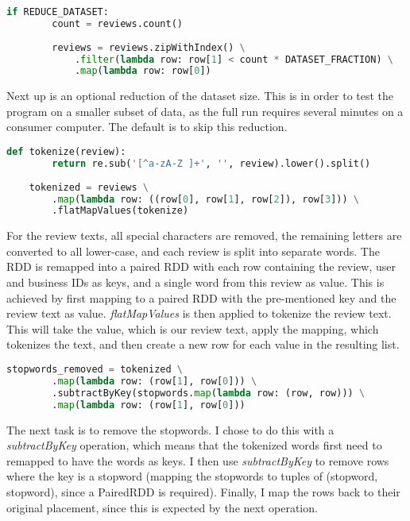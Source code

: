 \documentclass[a4paper]{article}
\begin{document}
\begin{lstlisting}[language=python]
    if REDUCE_DATASET:
        count = reviews.count()
        
        reviews = reviews.zipWithIndex() \
            .filter(lambda row: row[1] < count * DATASET_FRACTION) \
            .map(lambda row: row[0])
\end{lstlisting}

Next up is an optional reduction of the dataset size. This is in order to test the program on a smaller subset of data, as the full run requires several minutes on a consumer computer. The default is to skip this reduction.

\begin{lstlisting}[language=python]
    def tokenize(review):
        return re.sub('[^a-zA-Z ]+', '', review).lower().split()
    
    tokenized = reviews \
        .map(lambda row: ((row[0], row[1], row[2]), row[3])) \
        .flatMapValues(tokenize)
\end{lstlisting}

For the review texts, all special characters are removed, the remaining letters are converted to all lower-case, and each review is split into separate words. The RDD is remapped into a paired RDD with each row containing the review, user and business IDs as keys, and a single word from this review as value. This is achieved by first mapping to a paired RDD with the pre-mentioned key and the review text as value. \emph{flatMapValues} is then applied to tokenize the review text. This will take the value, which is our review text, apply the mapping, which tokenizes the text, and then create a new row for each value in the resulting list.

\begin{lstlisting}[language=python]
    stopwords_removed = tokenized \
        .map(lambda row: (row[1], row[0])) \
        .subtractByKey(stopwords.map(lambda row: (row, row))) \
        .map(lambda row: (row[1], row[0]))
\end{lstlisting}

The next task is to remove the stopwords. I chose to do this with a \emph{subtractByKey} operation, which means that the tokenized words first need to remapped to have the words as keys. I then use \emph{subtractByKey} to remove rows where the key is a stopword (mapping the stopwords to tuples of (stopword, stopword), since a PairedRDD is required). Finally, I map the rows back to their original placement, since this is expected by the next operation.
\end{document}
